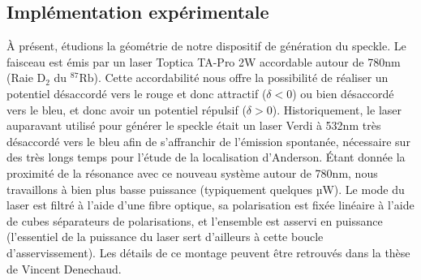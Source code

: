 \subsection{Implémentation expérimentale}
À présent, étudions la géométrie de notre dispositif de génération du speckle. Le faisceau est émis par un laser Toptica TA-Pro 2W accordable autour de 780nm (Raie $\mathrm{D}_2$ du ${}^{87}\text{Rb}$). Cette accordabilité nous offre la possibilité de réaliser un potentiel désaccordé vers le rouge et donc attractif ($\delta < 0$) ou bien désaccordé vers le bleu, et donc avoir un potentiel répulsif ($\delta > 0$). Historiquement, le laser auparavant utilisé pour générer le speckle était un laser Verdi à 532nm très désaccordé vers le bleu afin de s'affranchir de l'émission spontanée, nécessaire sur des très longs temps pour l'étude de la localisation d'Anderson. Étant donnée la proximité de la résonance avec ce nouveau système autour de 780nm, nous travaillons à bien plus basse puissance (typiquement quelques µW). Le mode du laser est filtré à l'aide d'une fibre optique, sa polarisation est fixée linéaire à l'aide de cubes séparateurs de polarisations, et l'ensemble est asservi en puissance (l'essentiel de la puissance du laser sert d'ailleurs à cette boucle d'asservissement). Les détails de ce montage peuvent être retrouvés dans la thèse de Vincent Denechaud. 

